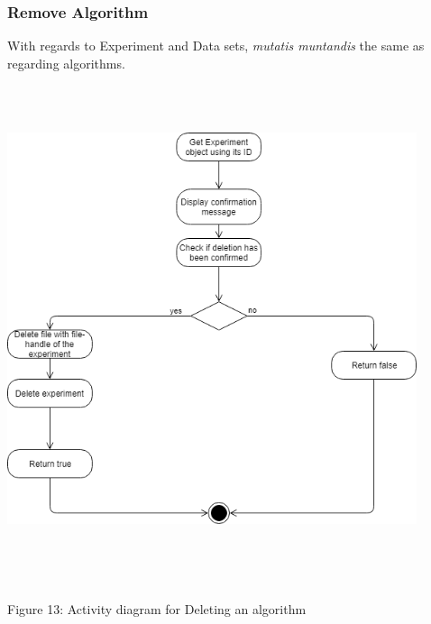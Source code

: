     \subsubsection{Remove Algorithm}
    \par With regards to Experiment and Data sets,
{ \textit{mutatis muntandis} the same as regarding algorithms.} \newline \newline
    \includegraphics[width=12cm,height=15cm,keepaspectratio]{input_unit/images/delete_activity_diagram.png}
	\begin{center}
	    \small{Figure 13: Activity diagram for Deleting an algorithm }
    \end{center}
    \newpage
